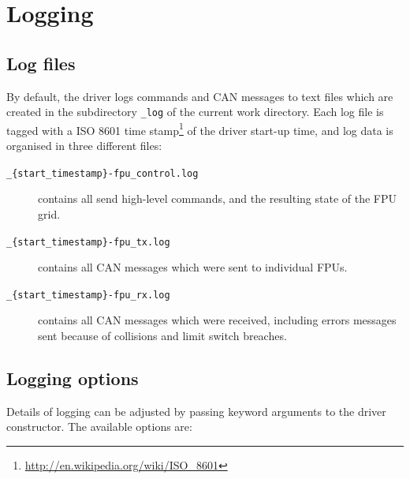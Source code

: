 \documentclass[11pt,a4paper]{report}
\begin{document}
\section{Logging}
\label{sec:logging}
\subsection{Log files}

By default, the driver logs commands and CAN messages to text files
which are created in the subdirectory \texttt{\_log} of the current
work directory. Each log file is tagged with a ISO 8601 time
stamp\footnote{\url{http://en.wikipedia.org/wiki/ISO\_8601}} of the
driver start-up time, and log data is organised in three different
files:

\begin{description}
\item[\texttt{\_\{start\_timestamp\}-fpu\_control.log}] contains all
  send high-level commands, and the resulting state of the FPU grid.
  
\item[\texttt{\_\{start\_timestamp\}-fpu\_tx.log}] contains all CAN messages which were sent to individual FPUs.
\item[\texttt{\_\{start\_timestamp\}-fpu\_rx.log}] contains all CAN
  messages which were received, including errors messages sent because
  of collisions and limit switch breaches.
  
\end{description}


\subsection{Logging options}
Details of logging can be adjusted by passing keyword
arguments to the driver constructor. The available options are:
\end{document}
